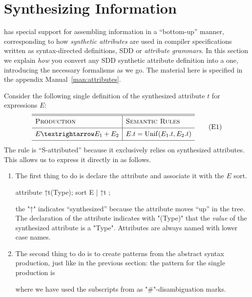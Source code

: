 \documentclass[11pt]{article} %
\begin{document}
\section{Synthesizing Information}
\label{sec:collect}

\HAX has special support for assembling information in a ``bottom-up'' manner, corresponding to how
\emph{synthetic attributes} are used in compiler specifications written as syntax-directed
definitions, \aka SDD or \emph{attribute grammars}.  In this section we explain \emph{how} you
convert any SDD synthetic attribute definition into a \HAX one, introducing the necessary \HAX
formalisms as we go.  The material here is specified in the appendix Manual~\ref{man:attributes}.

\begin{example}
  Consider the following single definition of the synthesized attribute $t$ for expressions $E$:
  \begin{equation}
    \begin{array}{l|l}
      \hline
      \hline
      \textsc{Production}  & \textsc{Semantic Rules} \Bigstrut\\
      \hline
      E → E_1 + E_2 & E.t = \op{Unif}(E_1.t, E_2.t) \Bigstrut\\
      \hline
    \end{array}
    \tag{E1}
  \end{equation}
  The rule is ``S-attributed'' because it exclusively relies on synthesized attributes. This allows us
  to express it directly in \HAX as follows.
  \begin{enumerate}

  \item The first thing to do is declare the attribute and associate it with the $E$ sort.
    \begin{hacs}
   attribute ↑t(Type);
   sort E | ↑t ;
    \end{hacs}
    the "↑" indicates ``synthesized'' because the attribute moves ``up'' in the tree. The
    declaration of the attribute indicates with "(Type)" that the \emph{value} of the synthesized
    attribute is a "Type".  Attributes are always named with lower case names.
  
  \item The second thing to do is to create patterns from the abstract syntax production, just like
    in the previous section: the pattern for the single production is
    where we have used the subscripts from  as "#"-disambiguation marks.


\end{enumerate}
\end{example}
\end{document}
